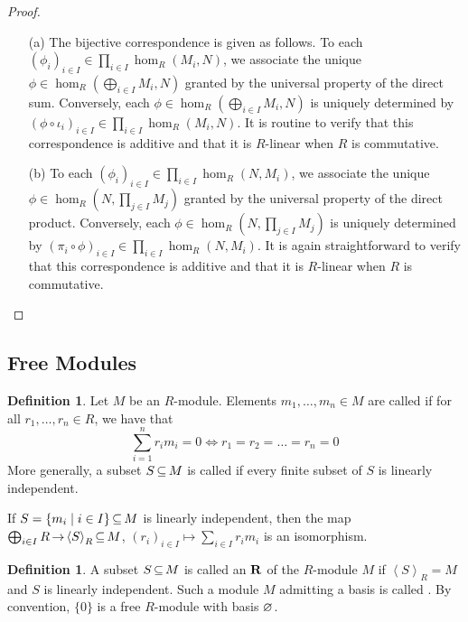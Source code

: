 \documentclass[11pt]{book}
\theoremstyle{definition}   \newtheorem{defn}[counter]{Definition} %
\newtheorem*{defn*}{Definition}
\newcommand{\gen}[1]{\left\langle #1 \right\rangle}   \newcommand{\stab}[2]{\tn{Stab}_{#1}(#2)}   \newcommand{\fix}[2]{\tn{Fix}_{#1}(#2)}   \newcommand{\op}{^{\tn{op}}}
\DeclareMathOperator{\ra}{\rightarrow}   \DeclareMathOperator{\Poly}{\mathbf{P}}   \DeclareMathOperator{\spn}{\textnormal{span}}   \DeclareMathOperator{\aut}{\textnormal{Aut}}
\newcommand{\vs}{\vspace{8pt}}
\numberwithin{counter}{chapter}
\begin{document}
\begin{proof}\
\begin{enumerate}
\item[(a)] The bijective correspondence is given as follows. To each $(\phi_i)_{i \in I} \in \prod_{i \in I} \hom_R(M_i,N)$, we associate the unique $\phi \in \hom_R(\bigoplus_{i \in I} M_i,N)$ granted by the universal property of the direct sum. Conversely, each $\phi \in \hom_R(\bigoplus_{i \in I} M_i,N)$ is uniquely determined by $(\phi \circ \iota_i)_{i \in I} \in \prod_{i \in I} \hom_R(M_i,N)$. It is routine to verify that this correspondence is additive and that it is $R$-linear when $R$ is commutative.

\item[(b)] To each $(\phi_i)_{i \in I} \in \prod_{i \in I} \hom_R(N,M_i)$, we associate the unique $\phi \in \hom_R(N,\prod_{j \in I} M_j)$ granted by the universal property of the direct product. Conversely, each $\phi \in  \hom_R(N,\prod_{j \in I} M_j)$ is uniquely determined by $(\pi_i \circ \phi)_{i \in I} \in \prod_{i \in I} \hom_R(N,M_i)$. It is again straightforward to verify that this correspondence is additive and that it is $R$-linear when $R$ is commutative.
\end{enumerate}
\end{proof}

\vs

\subsection*{Free Modules}

\vs

\begin{defn*}
Let $M$ be an $R$-module. Elements $m_1,\dots,m_n \in M$ are called  if for all $r_1,\dots,r_n \in R$, we have that
	\[\sum_{i = 1}^n r_i m_i = 0 \iff r_1 = r_2 = \dots = r_n = 0 \]
More generally, a subset $S \operatorname{\subseteq} M$ is called  if every finite subset of $S$ is linearly independent.
\end{defn*}

\vs

\begin{remark}
If $S = \{m_i \mid i \in I\} \operatorname{\subseteq} M$ is linearly independent, then the map $\bigoplus_{i \in I} R \ra \gen{S}_R \sub M$, $(r_i)_{i \in I} \mapsto \sum_{i \in I} r_i m_i$ is an isomorphism.
\end{remark}

\vs

\begin{defn}
A subset $S \operatorname{\subseteq} M$ is called an $\mathbf{R}$ of the $R$-module $M$ if $\gen{S}_R = M$ and $S$ is linearly independent. Such a module $M$ admitting a basis is called . By convention, $\{0\}$ is a free $R$-module with basis $\varnothing$.
\end{defn}
\end{document}
